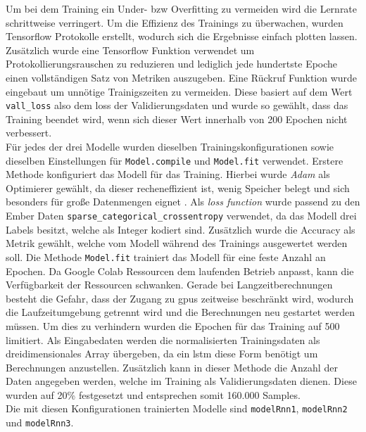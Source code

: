 \documentclass[
    12pt, %
    DIV10,
    ngerman, %
    a4paper, %
    oneside, %
    titlepage, %
    parskip=half, %
    headings=normal, %
    listof=totoc, %
    bibliography=totoc, %
    index=totoc, %
    captions=tableheading, %
    final %
]{scrreprt}
\begin{document}
Um bei dem Training ein Under- bzw Overfitting zu vermeiden wird die Lernrate schrittweise verringert. Um die Effizienz des Trainings zu überwachen, wurden Tensorflow Protokolle erstellt, wodurch sich die Ergebnisse einfach plotten lassen. Zusätzlich wurde eine Tensorflow Funktion verwendet um Protokollierungsrauschen zu reduzieren und lediglich jede hundertste Epoche einen vollständigen Satz von Metriken auszugeben. Eine Rückruf Funktion wurde eingebaut um unnötige Trainigszeiten zu vermeiden. Diese basiert auf dem Wert \texttt{vall\_loss} also dem loss der Validierungsdaten und wurde so gewählt, dass das Training beendet wird, wenn sich dieser Wert innerhalb von 200 Epochen nicht verbessert.\\ Für jedes der drei Modelle wurden dieselben Trainingskonfigurationen sowie dieselben Einstellungen für \texttt{Model.compile} und \texttt{Model.fit} verwendet.
Erstere Methode konfiguriert das Modell für das Training. Hierbei wurde \emph{Adam} als Optimierer gewählt, da dieser recheneffizient ist, wenig Speicher belegt und sich besonders für gro{\ss}e Datenmengen eignet \parencite{Kingma2015}. Als \emph{loss function} wurde passend zu den Ember Daten \texttt{sparse\_categorical\_crossentropy} verwendet, da das Modell drei Labels besitzt, welche als Integer kodiert sind. Zusätzlich wurde die Accuracy als Metrik gewählt, welche vom Modell während des Trainings ausgewertet werden soll. Die Methode \texttt{Model.fit} trainiert das Modell für eine feste Anzahl an Epochen. Da Google Colab Ressourcen dem laufenden Betrieb anpasst, kann die Verfügbarkeit der Ressourcen schwanken. Gerade bei Langzeitberechnungen besteht die Gefahr, dass der Zugang zu \acs{gpus} zeitweise beschränkt wird, wodurch die Laufzeitumgebung getrennt wird und die Berechnungen neu gestartet werden müssen. Um dies zu verhindern wurden die Epochen für das Training auf 500 limitiert. Als Eingabedaten werden die normalisierten Trainingsdaten als dreidimensionales Array übergeben, da ein \ac{lstm} diese Form benötigt um Berechnungen anzustellen. Zusätzlich kann in dieser Methode die Anzahl der Daten angegeben werden, welche im Training als Validierungsdaten dienen. Diese wurden auf 20\% festgesetzt und entsprechen somit 160.000 Samples.\\
Die mit diesen Konfigurationen trainierten Modelle sind \texttt{modelRnn1}, \texttt{modelRnn2} und \texttt{modelRnn3}.\\
\end{document}
